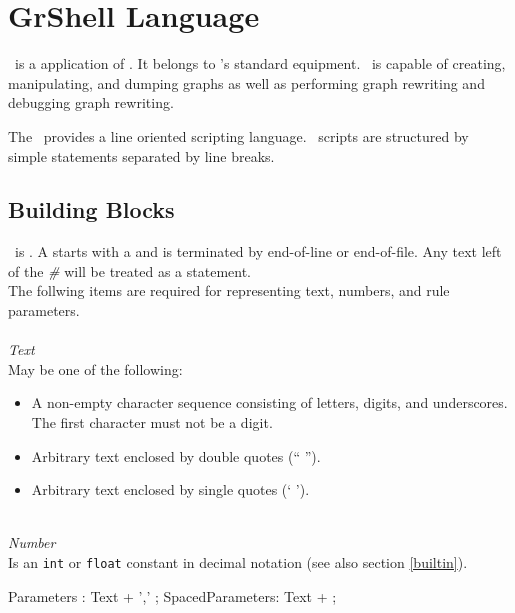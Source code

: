 \chapter{GrShell Language}
\label{chapgrshell}

\GrShell\ is a  application of \LibGr{}. It belongs to \GrG's standard equipment. \GrShell\ is capable of creating, manipulating, and dumping graphs as well as performing graph rewriting and debugging graph rewriting.

The \GrShell\ provides a line oriented scripting language. \GrShell\ scripts are structured by simple statements separated by line breaks.

\section{Building Blocks}

\GrShell\ is . A  starts with a \indexed{\texttt{\#}} and is terminated by end-of-line or end-of-file. Any text left of the \emph{\#} will be treated as a statement.\\
The follwing items are required for representing text, numbers, and rule parameters.\\
\\
\emph{Text}\\
May be one of the following:
\begin{itemize}
  \item A non-empty character sequence consisting of letters, digits, and underscores. The first character must not be a digit.
  \item Arbitrary text enclosed by double quotes (`` '').
  \item Arbitrary text enclosed by single quotes (` ').
\end{itemize}
\mbox{ }\\
\emph{Number}\\
Is an \texttt{int} or \texttt{float} constant in decimal notation (see also section \ref{builtin}).

\begin{rail} 
 Parameters : Text + ',' ;
 SpacedParameters: Text + ; 
\end{rail}


